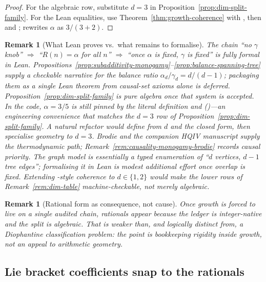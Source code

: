 \documentclass[11pt]{amsart}
\newtheorem{remark}[theorem]{Remark}
\begin{document}
\begin{proof}
For the algebraic row, substitute \(d=3\) in Proposition~\ref{prop:dim-split-family}. For the Lean equalities, use Theorem~\ref{thm:growth-coherence} with , then  and ;  rewrites \(\alpha\) as \(3/(3+2)\).
\end{proof}

\begin{remark}[What Lean proves vs.\ what remains to formalise]
The chain ``no \(\gamma\) knob'' \(\Rightarrow\) ``\(R(n)=\alpha\) for all \(n\)'' \(\Rightarrow\) ``once \(\alpha\) is fixed, \(\gamma\) is fixed'' is fully formal in Lean. Propositions~\ref{prop:subadditivity-monogamy}--\ref{prop:balance-spanning-tree} supply a checkable narrative for the balance ratio \(\alpha_d/\gamma_d=d/(d-1)\); packaging them as a single Lean theorem from causal-set axioms alone is deferred. Proposition~\ref{prop:dim-split-family} is pure algebra once that system is accepted. In the code, \(\alpha=3/5\) is still pinned by the literal definition  and  ()---an engineering convenience that matches the \(d=3\) row of Proposition~\ref{prop:dim-split-family}. A natural refactor would define  from \(d\) and the closed form, then specialise geometry to \(d=3\). Brodie \cite{brodie2026} and the companion HQIV manuscript supply the thermodynamic path; Remark~\ref{rem:causality-monogamy-brodie} records causal priority. The graph model is essentially a typed enumeration of ``\(d\) vertices, \(d-1\) tree edges''; formalising it in Lean is modest additional effort once overlap is fixed. Extending -style coherence to \(d\in\{1,2\}\) would make the lower rows of Remark~\ref{rem:dim-table} machine-checkable, not merely algebraic.
\end{remark}

\begin{remark}[Rational form as consequence, not cause]
Once growth is forced to live on a single audited chain, rationals appear because the ledger is integer-native and the split is algebraic. That is weaker than, and logically distinct from, a Diophantine classification problem: the point is \emph{bookkeeping rigidity inside growth}, not an appeal to arithmetic geometry.
\end{remark}

\subsection{Lie bracket coefficients snap to the rationals}
\end{document}
